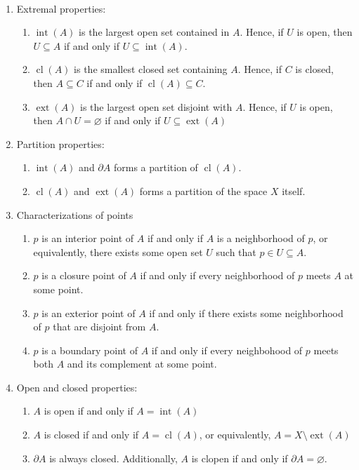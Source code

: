 \documentclass{treatise}
\begin{document}
\begin{proposition} \label{topo-subset-top-prop-1} \ 
\begin{enumerate}
    \item Extremal properties:
    \begin{enumerate}
        \item $\operatorname{int}(A)$ is the largest open set contained in $A$. Hence, if $U$ is open, then $U \subseteq A$ if and only if $U \subseteq \operatorname{int}(A)$.
        \item $\operatorname{cl}(A)$ is the smallest closed set containing $A$. Hence, if $C$ is closed, then $A \subseteq C$ if and only if $\operatorname{cl}(A) \subseteq C$.
        \item $\operatorname{ext}(A)$ is the largest open set disjoint with $A$. Hence, if $U$ is open, then $A \cap U = \varnothing$ if and only if $U \subseteq \operatorname{ext}(A)$
    \end{enumerate}
    \item Partition properties:
    \begin{enumerate}
        \item $\operatorname{int}(A)$ and $\partial A$ forms a partition of $\operatorname{cl}(A)$.
        \item $\operatorname{cl}(A)$ and $\operatorname{ext}(A)$ forms a partition of the space $X$ itself.
    \end{enumerate}
    \item Characterizations of points
    \begin{enumerate}
        \item $p$ is an interior point of $A$ if and only if $A$ is a neighborhood of $p$, or equivalently, there exists some open set $U$ such that $p \in U \subseteq A$.
        \item $p$ is a closure point of $A$ if and only if every neighborhood of $p$ meets $A$ at some point.
        \item $p$ is an exterior point of $A$ if and only if there exists some neighborhood of $p$ that are disjoint from $A$.
        \item $p$ is a boundary point of $A$ if and only if every neighbohood of $p$ meets both $A$ and its complement at some point.
    \end{enumerate}
    \item Open and closed properties:
    \begin{enumerate}
        \item $A$ is open if and only if $A = \operatorname{int}(A)$
        \item $A$ is closed if and only if $A = \operatorname{cl}(A)$, or equivalently, $A = X \setminus \operatorname{ext}(A)$
        \item $\partial A$ is always closed. Additionally, $A$ is clopen if and only if $\partial A = \varnothing$.
    \end{enumerate}
\end{enumerate}
\end{proposition}
\end{document}
